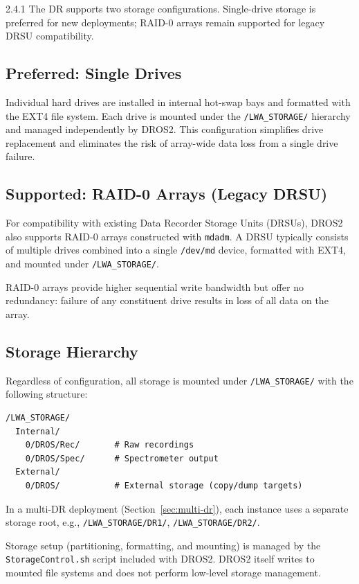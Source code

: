 \begin{newInVersion}{2.4.1}
The DR supports two storage configurations.  Single-drive storage is preferred
for new deployments; RAID-0 arrays remain supported for legacy DRSU
compatibility.
\end{newInVersion}

\subsection{Preferred: Single Drives}

Individual hard drives are installed in internal hot-swap bays and formatted
with the EXT4 file system.  Each drive is mounted under the
\texttt{/LWA\_STORAGE/} hierarchy and managed independently by DROS2.
This configuration simplifies drive replacement and eliminates the risk of
array-wide data loss from a single drive failure.

\subsection{Supported: RAID-0 Arrays (Legacy DRSU)}

For compatibility with existing Data Recorder Storage Units (DRSUs), DROS2
also supports RAID-0 arrays constructed with \texttt{mdadm}.  A DRSU
typically consists of multiple drives combined into a single \texttt{/dev/md}
device, formatted with EXT4, and mounted under \texttt{/LWA\_STORAGE/}.

RAID-0 arrays provide higher sequential write bandwidth but offer no
redundancy: failure of any constituent drive results in loss of all data on
the array.

\subsection{Storage Hierarchy}

Regardless of configuration, all storage is mounted under
\texttt{/LWA\_STORAGE/} with the following structure:

\begin{lstlisting}
/LWA_STORAGE/
  Internal/
    0/DROS/Rec/       # Raw recordings
    0/DROS/Spec/      # Spectrometer output
  External/
    0/DROS/           # External storage (copy/dump targets)
\end{lstlisting}

In a multi-DR deployment (Section~\ref{sec:multi-dr}), each instance uses a
separate storage root, e.g., \texttt{/LWA\_STORAGE/DR1/},
\texttt{/LWA\_STORAGE/DR2/}.

Storage setup (partitioning, formatting, and mounting) is managed by the
\texttt{StorageControl.sh} script included with DROS2.  DROS2 itself writes
to mounted file systems and does not perform low-level storage management.
